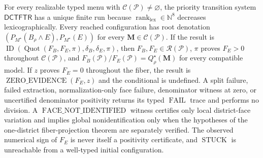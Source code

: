 For every realizable typed menu with \(\mathcal C(\mathcal P)\ne\varnothing\), the priority transition system \(\mathsf{DCTFTR}\) has a unique finite run because \(\operatorname{rank}_{\mathrm{lex}}\in\mathbb N^8\) decreases lexicographically. Every reached configuration has root denotation \((P_{M^\star}(B_\rho\wedge E),P_{M^\star}(E))\) for every \(\mathbf M\in\mathcal C(\mathcal P)\). If the result is \(\operatorname{ID}(\operatorname{Quot}(F_B,F_E,\pi),\delta_B,\delta_E,\pi)\), then \(F_B,F_E\in\mathscr R(\mathcal P)\), \(\pi\) proves \(F_E>0\) throughout \(\mathcal C(\mathcal P)\), and \(F_B(\mathcal P)/F_E(\mathcal P)=Q_\rho^\star(\mathbf M)\) for every compatible model. If \(z\) proves \(F_E=0\) throughout the fiber, the result is \(\operatorname{ZERO\_EVIDENCE}(F_E,z)\) and the conditional is undefined. A split failure, failed extraction, normalization-only face failure, denominator witness at zero, or uncertified denominator positivity returns its typed \(\operatorname{FAIL}\) trace and performs no division. A \(\operatorname{FACE\_NOT\_IDENTIFIED}\) witness certifies only local district-face variation and implies global nonidentification only when the hypotheses of the one-district fiber-projection theorem are separately verified. The observed numerical sign of \(F_E\) is never itself a positivity certificate, and \(\operatorname{STUCK}\) is unreachable from a well-typed initial configuration.